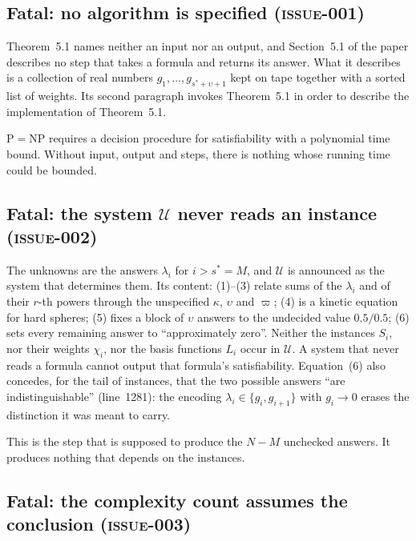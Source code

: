 \documentclass[11pt,a4paper]{article}
\newcommand{\paperline}[1]{(line~#1)}
\newcommand{\issue}[1]{\textrm{\mdseries\textsc{issue-#1}}}
\begin{document}
\subsection{Fatal: no algorithm is specified (\issue{001})}

Theorem~5.1 names neither an input nor an output, and Section~5.1 of the paper describes no step that takes a formula and returns its answer. What it describes is a collection of real numbers $g_1,\ldots,g_{s^*+\upsilon+1}$ kept on tape together with a sorted list of weights. Its second paragraph invokes Theorem~5.1 in order to describe the implementation of Theorem~5.1.

$\mathrm{P}=\mathrm{NP}$ requires a decision procedure for satisfiability with a polynomial time bound. Without input, output and steps, there is nothing whose running time could be bounded.

\subsection{Fatal: the system $\mathcal U$ never reads an instance (\issue{002})}

The unknowns are the answers $\lambda_i$ for $i>s^*=M$, and $\mathcal U$ is announced as the system that determines them. Its content: (1)--(3) relate sums of the $\lambda_i$ and of their $r$-th powers through the unspecified $\kappa$, $\upsilon$ and $\varpi$; (4) is a kinetic equation for hard spheres; (5) fixes a block of $\upsilon$ answers to the undecided value $0.5/0.5$; (6) sets every remaining answer to ``approximately zero''. Neither the instances $S_i$, nor their weights $\chi_i$, nor the basis functions $L_i$ occur in $\mathcal U$. A system that never reads a formula cannot output that formula's satisfiability. Equation~(6) also concedes, for the tail of instances, that the two possible answers ``are indistinguishable'' \paperline{1281}: the encoding $\lambda_i\in\{g_i,g_{i+1}\}$ with $g_i\to 0$ erases the distinction it was meant to carry.

This is the step that is supposed to produce the $N-M$ unchecked answers. It produces nothing that depends on the instances.

\subsection{Fatal: the complexity count assumes the conclusion (\issue{003})}
\end{document}
